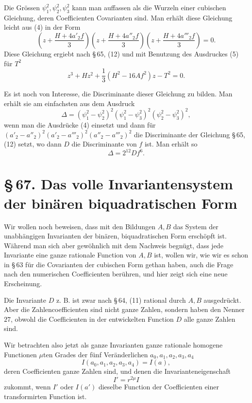 \documentclass[11pt]{article}
\newcommand{\sect}[2]{\section*{\S\,#1. #2}}
\begin{document}
Die Grössen $\psi_1^2,\psi_2^2,\psi_3^2$ kann man auffassen als die Wurzeln einer cubischen Gleichung, deren Coefficienten Covarianten sind. Man erhält diese Gleichung leicht aus (4) in der Form
\[
 \left(z+\frac{H+4a'_2f}{3}\right)
 \left(z+\frac{H+4a''_2f}{3}\right)
 \left(z+\frac{H+4a'''_2f}{3}\right)=0.
\]
Diese Gleichung ergiebt nach \S\,65, (12) und mit Benutzung des Ausdruckes (5) für $T^2$
\begin{equation}
 z^3+Hz^2+\frac13(H^2-16Af^2)z-T^2=0.
\tag{7}
\end{equation}

Es ist noch von Interesse, die Discriminante dieser Gleichung zu bilden. Man erhält sie am einfachsten aus dem Ausdruck
\[
 \Delta=(\psi_1^2-\psi_2^2)^2(\psi_1^2-\psi_3^2)^2(\psi_2^2-\psi_3^2)^2,
\]
wenn man die Ausdrücke (4) einsetzt und dann für $(a'_2-a''_2)^2(a'_2-a'''_2)^2(a''_2-a'''_2)^2$ die Discriminante der Gleichung \S\,65, (12) setzt, wo dann $D$ die Discriminante von $f$ ist. Man erhält so
\begin{equation}
 \Delta=2^{12}Df^6.
\tag{8}
\end{equation}

\sect{67}{Das volle Invariantensystem der binären biquadratischen Form}

Wir wollen noch beweisen, dass mit den Bildungen $A,B$ das System der unabhängigen Invarianten der binären, biquadratischen Form erschöpft ist. Während man sich aber gewöhnlich mit dem Nachweis begnügt, dass jede Invariante eine ganze rationale Function von $A,B$ ist, wollen wir, wie wir es schon in \S\,63 für die Covarianten der cubischen Form gethan haben, auch die Frage nach den numerischen Coefficienten berühren, und hier zeigt sich eine neue Erscheinung.

Die Invariante $D$ z. B. ist zwar nach \S\,64, (11) rational durch $A,B$ ausgedrückt. Aber die Zahlencoefficienten sind nicht ganze Zahlen, sondern haben den Nenner $27$, obwohl die Coefficienten in der entwickelten Function $D$ alle ganze Zahlen sind.

Wir betrachten also jetzt als ganze Invarianten ganze rationale homogene Functionen $\mu$ten Grades der fünf Veränderlichen $a_0,a_1,a_2,a_3,a_4$
\begin{equation}
 I(a_0,a_1,a_2,a_3,a_4)=I(a),
\tag{1}
\end{equation}
deren Coefficienten ganze Zahlen sind, und denen die Invarianteneigenschaft
\begin{equation}
 I'=r^{2\mu}I
\tag{2}
\end{equation}
zukommt, wenn $I'$ oder $I(a')$ dieselbe Function der Coefficienten einer transformirten Function ist.
\end{document}
